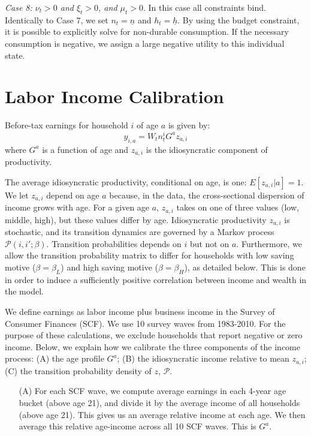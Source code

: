 \documentclass[letterpaper,12pt,dvipsnames,usenames]{article}
\theoremstyle{definition}
\begin{document}
\begin{spacing}{1.0}
\begin{small}
\emph{Case 8: $\nu_{t}>0$ and $\xi_{t}>0$, and $\mu_{t}>0$}. In this case all constraints bind. Identically to Case 7, we set $n_{t}=\underline{n}$ and $h_{t}=\underline{h}$. By using the budget constraint, it is possible to explicitly solve for non-durable consumption. If the necessary consumption is negative, we assign a large negative utility to this individual state.


\newpage

\section{Labor Income Calibration}\label{app:labinccalib}

Before-tax earnings for household $i$ of age $a$ is given by:
\[y_{i,a} = W_t n_t^i G^a z_{a,i}\]
where $G^a$ is a function of age and $z_{a,i}$ is the idiosyncratic component of productivity.

The average idiosyncratic productivity, conditional on age, is one: $E[z_{a,i}|a]=1$. We let $z_{a,i}$ depend on age $a$ because, in the data, the cross-sectional dispersion of income grows with age. For a given age $a$, $z_{a,i}$ takes on one of three values (low, middle, high), but these values differ by age. Idiosyncratic productivity $z_{a,i}$ is stochastic, and its transition dynamics are governed by a Markov process $\mathcal{P}(i,i';\beta)$. Transition probabilities depends on $i$ but not on $a$. Furthermore, we allow the transition probability matrix to differ for households with low saving motive ($\beta=\beta_L$) and high saving motive ($\beta=\beta_H$), as detailed below. This is done in order to induce a sufficiently positive correlation between income and wealth in the model.

We define earnings as labor income plus business income in the Survey of Consumer Finances (SCF). We use 10 survey waves from 1983-2010. For the purpose of these calculations, we exclude households that report negative or zero income. Below, we explain how we calibrate the three components of the income process: (A) the age profile $G^a$; (B) the idiosyncratic income relative to mean $z_{a,i}$; (C) the transition probability density of $z$, $\mathcal{P}$.

\begin{enumerate}
\item[(A)] For each SCF wave, we compute average earnings in each 4-year age bucket (above age 21), and divide it by the average income of all households (above age 21). This gives us an average relative income at each age. We then average this relative age-income across all 10 SCF waves. This is $G^a$.


\end{enumerate}
\end{small}
\end{spacing}
\end{document}
